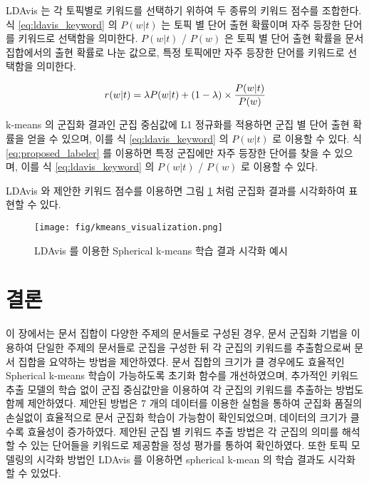\documentclass[oneside, ko,phd]{snuthesis_utf8_kor}
\begin{document}
LDAvis 는 각 토픽별로 키워드를 선택하기 위하여 두 종류의 키워드 점수를 조합한다.
식 \ref{eq:ldavis_keyword} 의 $P(w \vert t)$ 는 토픽 별 단어 출현 확률이며 자주 등장한 단어를 키워드로 선택함을 의미한다.
$P(w \vert t)$ / $P(w)$ 은 토픽 별 단어 출현 확률을 문서 집합에서의 출현 확률로 나눈 값으로, 특정 토픽에만 자주 등장한 단어를 키워드로 선택함을 의미한다.

\begin{equation}
\label{eq:ldavis_keyword}
\centering
r(w \vert t) = \lambda P(w \vert t) + (1 - \lambda) \times \frac{P(w \vert t)}{P(w)}
\end{equation}

k-means 의 군집화 결과인 군집 중심값에 L1 정규화를 적용하면 군집 별 단어 출현 확률을 얻을 수 있으며, 이를 식 \ref{eq:ldavis_keyword} 의 $P(w \vert t)$ 로 이용할 수 있다.
식 \ref{eq:proposed_labeler} 를 이용하면 특정 군집에만 자주 등장한 단어를 찾을 수 있으며, 이를 식 \ref{eq:ldavis_keyword} 의 $P(w \vert t)$ / $P(w)$ 로 이용할 수 있다.

LDAvis 와 제안한 키워드 점수를 이용하면 그림 \ref{fig:kmeans_ldavis} 처럼 군집화 결과를 시각화하여 표현할 수 있다.

\begin{figure}[H]
\centering
\texttt{[image: fig/kmeans\_visualization.png]}
\caption{LDAvis 를 이용한 Spherical k-means 학습 결과 시각화 예시}
\label{fig:kmeans_ldavis}
\end{figure}


\section{결론}

이 장에서는 문서 집합이 다양한 주제의 문서들로 구성된 경우, 문서 군집화 기법을 이용하여 단일한 주제의 문서들로 군집을 구성한 뒤 각 군집의 키워드를 추출함으로써 문서 집합을 요약하는 방법을 제안하였다.
문서 집합의 크기가 클 경우에도 효율적인 Spherical k-means 학습이 가능하도록 초기화 함수를 개선하였으며, 추가적인 키워드 추출 모델의 학습 없이 군집 중심값만을 이용하여 각 군집의 키워드를 추출하는 방법도 함께 제안하였다.
제안된 방법은 7 개의 데이터를 이용한 실험을 통하여 군집화 품질의 손실없이 효율적으로 문서 군집화 학습이 가능함이 확인되었으며, 데이터의 크기가 클수록 효율성이 증가하였다.
제안된 군집 별 키워드 추출 방법은 각 군집의 의미를 해석할 수 있는 단어들을 키워드로 제공함을 정성 평가를 통하여 확인하였다.
또한 토픽 모델링의 시각화 방법인 LDAvis 를 이용하면 spherical k-mean 의 학습 결과도 시각화 할 수 있었다.
\end{document}
